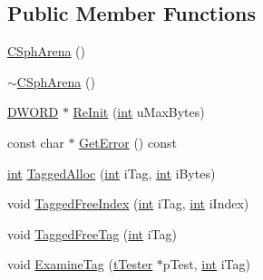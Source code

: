\subsection*{Public Member Functions}
\begin{DoxyCompactItemize}
\item 
\hyperlink{classCSphArena_a6315a33fe17debc8784a71e7e252e371}{C\-Sph\-Arena} ()
\item 
\hyperlink{classCSphArena_ade3cc30b78af61a5c290c2a9c3a4ac9c}{$\sim$\-C\-Sph\-Arena} ()
\item 
\hyperlink{sphinxstd_8h_a798af1e30bc65f319c1a246cecf59e39}{D\-W\-O\-R\-D} $\ast$ \hyperlink{classCSphArena_a13e49ce27eb7ce8eb42cb0b946460e3f}{Re\-Init} (\hyperlink{sphinxexpr_8cpp_a4a26e8f9cb8b736e0c4cbf4d16de985e}{int} u\-Max\-Bytes)
\item 
const char $\ast$ \hyperlink{classCSphArena_a9752f5154168bc7149a3e7a7ddee3013}{Get\-Error} () const 
\item 
\hyperlink{sphinxexpr_8cpp_a4a26e8f9cb8b736e0c4cbf4d16de985e}{int} \hyperlink{classCSphArena_a64d121f1879f8d40d77224c32d4521ea}{Tagged\-Alloc} (\hyperlink{sphinxexpr_8cpp_a4a26e8f9cb8b736e0c4cbf4d16de985e}{int} i\-Tag, \hyperlink{sphinxexpr_8cpp_a4a26e8f9cb8b736e0c4cbf4d16de985e}{int} i\-Bytes)
\item 
void \hyperlink{classCSphArena_a9bcf5fb5d79a8e651ff6a81e1a0b5835}{Tagged\-Free\-Index} (\hyperlink{sphinxexpr_8cpp_a4a26e8f9cb8b736e0c4cbf4d16de985e}{int} i\-Tag, \hyperlink{sphinxexpr_8cpp_a4a26e8f9cb8b736e0c4cbf4d16de985e}{int} i\-Index)
\item 
void \hyperlink{classCSphArena_a5795ff507920cb57055a4bdb0ff951cd}{Tagged\-Free\-Tag} (\hyperlink{sphinxexpr_8cpp_a4a26e8f9cb8b736e0c4cbf4d16de985e}{int} i\-Tag)
\item 
void \hyperlink{classCSphArena_afb3e5e61d380f4a1b3df6a2e6a29a6c0}{Examine\-Tag} (\hyperlink{classtTester}{t\-Tester} $\ast$p\-Test, \hyperlink{sphinxexpr_8cpp_a4a26e8f9cb8b736e0c4cbf4d16de985e}{int} i\-Tag)
\end{DoxyCompactItemize}
